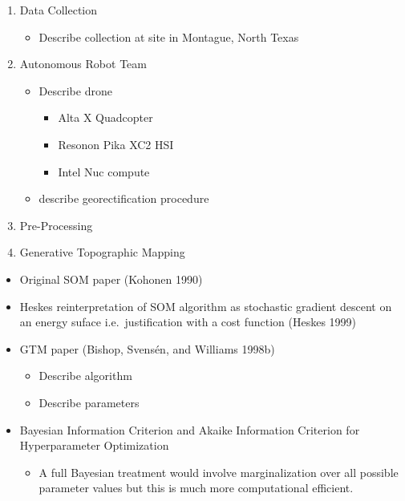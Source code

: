 \documentclass[
  letterpaper,
  DIV=11,
  numbers=noendperiod]{scrartcl}
\providecommand{\tightlist}{%
  \setlength{\itemsep}{0pt}\setlength{\parskip}{0pt}}\usepackage{longtable,booktabs,array}
\begin{document}
\begin{enumerate}
\def\labelenumi{\arabic{enumi}.}
\tightlist
\item
  Data Collection

  \begin{itemize}
  \tightlist
  \item
    Describe collection at site in Montague, North Texas
  \end{itemize}
\item
  Autonomous Robot Team

  \begin{itemize}
  \tightlist
  \item
    Describe drone

    \begin{itemize}
    \tightlist
    \item
      Alta X Quadcopter
    \item
      Resonon Pika XC2 HSI
    \item
      Intel Nuc compute
    \end{itemize}
  \item
    describe georectification procedure
  \end{itemize}
\item
  Pre-Processing
\item
  Generative Topographic Mapping
\end{enumerate}

\begin{itemize}
\tightlist
\item
  Original SOM paper (Kohonen 1990)
\item
  Heskes reinterpretation of SOM algorithm as stochastic gradient
  descent on an energy suface i.e.~justification with a cost function
  (Heskes 1999)
\item
  GTM paper (Bishop, Svensén, and Williams 1998b)

  \begin{itemize}
  \tightlist
  \item
    Describe algorithm
  \item
    Describe parameters
  \end{itemize}
\item
  Bayesian Information Criterion and Akaike Information Criterion for
  Hyperparameter Optimization

  \begin{itemize}
  \tightlist
  \item
    A full Bayesian treatment would involve marginalization over all
    possible parameter values but this is much more computational
    efficient.
  \end{itemize}
\end{itemize}
\end{document}
